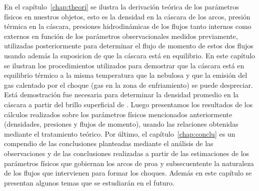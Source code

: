 En el capítulo~\ref{chap:theori} se ilustra la derivación teórica de los parámetros físicos en nuestros objetos, esto es la densidad en la cáscara de los arcos, presión térmica en la cáscara, presiones hidrodinámicas de los flujos tanto internos como externos en función de los parámetros observacionales medidos previamente, utilizadas posteriormente para determinar el flujo de momento de estos dos flujos usando además la suposicion de que la cáscara está en equilibrio. En este capítulo se ilustran los procedimientos utilizados para demostrar que la cáscara está en equilibrio térmico a la misma temperatura que la nebulosa y que la emisión del gas calentado por el choque (gas en la zona de enfriamiento) se puede despreciar. Está demostración fue necesaria para determinar la densidad promedio en la cáscara a partir del brillo superficial de \ha{}. Luego  presentamos los resultados de los cálculos realizados sobre los parámetros físicos mencionados anteriormente (densidades, presiones y flujos de momento), usando las relaciones obtenidas mediante el tratamiento teórico. Por último, el capítulo~\ref{chap:conclu} es un compendio de las conclusiones planteadas mediante el análisis de las observaciones y de las conclusiones realizadas a partir de las  estimaciones de los parámetros físicos que gobiernan los arcos de proa y subsecuentente la naturaleza de los flujos que intervienen para formar los choques. Además en este capítulo se presentan algunos temas que se estudiarán en el futuro.  

% 

% 
